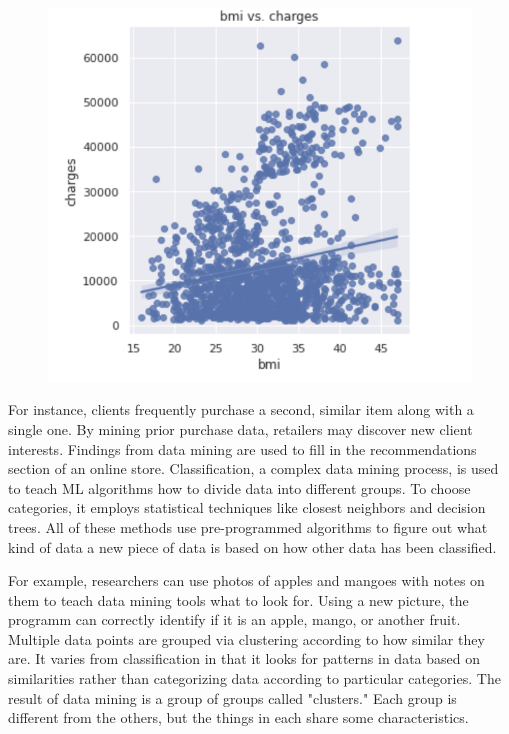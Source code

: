 \documentclass[journal]{IEEEtran}
\begin{document}
\begin{figure}[h]
  \centering
  \includegraphics [width= 3.55 in]{5.png}
\caption{}
  \label{storage}
\end{figure}


\par For instance, clients frequently purchase a second, similar item along with a single one. By mining prior purchase data, retailers may discover new client interests. Findings from data mining are used to fill in the recommendations section of an online store. Classification, a complex data mining process, is used to teach ML algorithms how to divide data into different groups. To choose categories, it employs statistical techniques like closest neighbors and decision trees. All of these methods use pre-programmed algorithms to figure out what kind of data a new piece of data is based on how other data has been classified.

For example, researchers can use photos of apples and mangoes with notes on them to teach data mining tools what to look for. Using a new picture, the programm can correctly identify if it is an apple, mango, or another fruit.
Multiple data points are grouped via clustering according to how similar they are. It varies from classification in that it looks for patterns in data based on similarities rather than categorizing data according to particular categories. The result of data mining is a group of groups called "clusters." Each group is different from the others, but the things in each share some characteristics.
\end{document}
